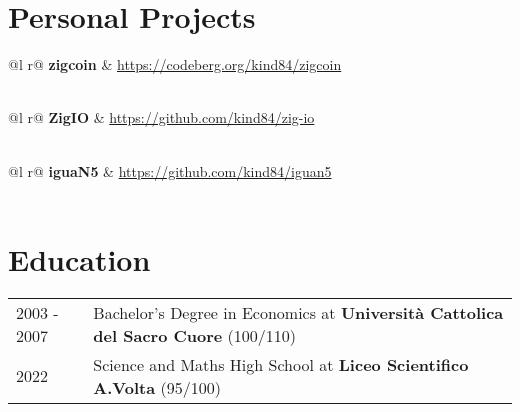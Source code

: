\documentclass[a4paper,11pt]{article}
\begin{document}
\section{Personal Projects}

\begin{tabularx}{\linewidth}{ @{}l r@{} }
\textbf{zigcoin} & \hfill \href{https://codeberg.org/kind84/zigcoin}{https://codeberg.org/kind84/zigcoin} \\[3.75pt]
  \\
\end{tabularx}

\begin{tabularx}{\linewidth}{ @{}l r@{} }
\textbf{ZigIO} & \hfill \href{https://github.com/kind84/zig-io}{https://github.com/kind84/zig-io} \\[3.75pt]
  \\
\end{tabularx}

\begin{tabularx}{\linewidth}{ @{}l r@{} }
\textbf{iguaN5} & \hfill \href{https://github.com/kind84/iguan5}{https://github.com/kind84/iguan5} \\[3.75pt]
  \\
\end{tabularx}

\section{Education}
\begin{tabularx}{\linewidth}{@{}l X@{}}	
2003 - 2007 & Bachelor's Degree in Economics at \textbf{Università Cattolica del Sacro Cuore} \hfill (100/110) \\ 

2022 & Science and Maths High School at \textbf{Liceo Scientifico A.Volta} \hfill  (95/100) \\
\end{tabularx}
\end{document}
